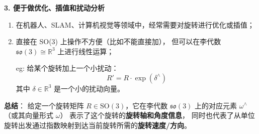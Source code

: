 \documentclass{article}
\begin{document}
\textbf{3. 便于做优化、插值和扰动分析}
\begin{enumerate}
\item 在机器人、SLAM、计算机视觉等领域中，经常需要对旋转进行优化或插值；
\item 直接在 SO(3) 上操作不方便（比如不能直接加），
  但可以在李代数 $ \mathfrak{so}(3) \cong \mathbb{R}^3 $ 上进行线性运算；

 eg: 给某个旋转加上一个小扰动：
  $$
  R' = R \cdot \exp(\delta^\wedge)
  $$
  其中 $ \delta \in \mathbb{R}^3 $ 是一个小的扰动向量。

\end{enumerate}

\textbf{总结}：
 给定一个旋转矩阵 $ R \in \text{SO}(3) $，它在李代数 $ \mathfrak{so}(3) $
 上的对应元素 $ \omega^\wedge $（或其向量形式 $ \omega $）
 表示了这个旋转的\textbf{旋转轴和角度信息}，
 同时也代表了从单位旋转出发通过指数映射到达当前旋转所需的\textbf{旋转速度/方向}。
\end{document}
